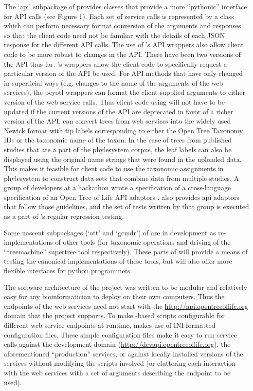\begin{methods}
The `api' subpackage of \pey provides classes that provide a more ``pythonic'' interface 
for \otol API calls (see Figure 1).
Each set of service calls is represented by a class which can perform necessary 
    format conversion of the arguments and responses so that the client code need 
    not be familiar with the details of each JSON response for the different API calls.
The use of \pey's API wrappers also allow client code to be more robust to changes in the API.
There have been two versions of the \otol API thus far.
\Pey's wrappers allow the client code to specifically request a particular version of the API be used.
For API methods that have only changed in superficial ways (e.g. changes to the name of 
the arguments of the web services), the peyotl wrappers can format the client-supplied arguments
to either version of the web service calls.
Thus client code using \pey will not have to be updated if the current versions of the
    API are deprecated in favor of a richer version of the \otol API.
\Pey can convert trees from \otol web services into the widely used Newick format with tip
    labels corresponding to either the Open Tree Taxonomy IDs or the taxonomic name of the taxon.
In the case of trees from published studies that are a part of the phylesystem corpus, the
    leaf labels can also be displayed using the original name strings that were found in
    the uploaded data.
This makes it feasible for client code to use the taxonomic assignments in phylesystem to 
    construct data sets that combine data from multiple studies.
A group of developers at a hackathon wrote a specification of a cross-language specification
of an Open Tree of Life API adaptors \citep{sharedapitests}.
\Pey also provides api adaptors that follow those guidelines, and the set of
    tests written by that group is executed as a part of \pey's regular regression testing.


Some nascent subpackages (`ott' and `gcmdr') of \pey are in development as re-implementations
    of other \otol tools (for taxonomic operations and driving of the ``treemachine'' supertree tool
    respectively).
These parts of \pey will provide a means of testing the canonical implementations of these
    tools, but will also offer more flexible interfaces for python programmers.

The software architecture of the \otol project was written to be modular and relatively 
    easy for any bioinformatician to deploy on their own computers.
Thus the endpoints of the \otol web services need not start with the \url{http://api.opentreeoflife.org} domain that the project supports.
To make \pey-based scripts configurable for different web-service endpoints at runtime, \pey
    makes use of INI-formatted configuration files.
These simple configuration files make it easy to run service calls against the development domain (\url{http://devapi.opentreeoflife.org}), the aforementioned ``production'' services, or against locally installed
versions of the services without modifying the scripts involved (or cluttering each interaction with the web services with a set of arguments describing the endpoint to be used).

\end{methods}

